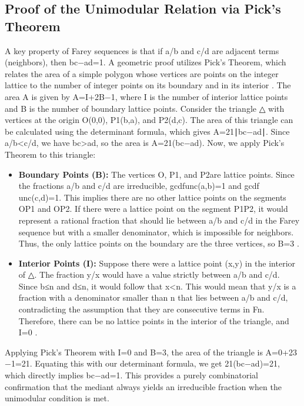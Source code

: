 \documentclass[12pt,a4paper]{article}
\theoremstyle{definition}
\theoremstyle{remark}
\begin{document}
\subsection{Proof of the Unimodular Relation via Pick's Theorem}
A key property of Farey sequences is that if a/b and c/d are adjacent terms (neighbors), then bc−ad=1. A geometric proof utilizes Pick's Theorem, which relates the area of a simple polygon whose vertices are points on the integer lattice to the number of integer points on its boundary and in its interior \cite{DUMMIT}. The area A is given by A=I+2B​−1, where I is the number of interior lattice points and B is the number of boundary lattice points.
Consider the triangle △ with vertices at the origin O(0,0), P1​(b,a), and P2​(d,c). The area of this triangle can be calculated using the determinant formula, which gives A=21​∣bc−ad∣. Since a/b<c/d, we have bc>ad, so the area is A=21​(bc−ad).
Now, we apply Pick's Theorem to this triangle:
\begin{itemize}
\item \textbf{Boundary Points (B):} The vertices O, P1​, and P2​ are lattice points. Since the fractions a/b and c/d are irreducible, gcdf​unc(a,b)=1 and gcdf​unc(c,d)=1. This implies there are no other lattice points on the segments OP1​ and OP2​. If there were a lattice point on the segment P1​P2​, it would represent a rational fraction that should lie between a/b and c/d in the Farey sequence but with a smaller denominator, which is impossible for neighbors. Thus, the only lattice points on the boundary are the three vertices, so B=3 \cite{DUMMIT}.
\item \textbf{Interior Points (I):} Suppose there were a lattice point (x,y) in the interior of △. The fraction y/x would have a value strictly between a/b and c/d. Since b≤n and d≤n, it would follow that x<n. This would mean that y/x is a fraction with a denominator smaller than n that lies between a/b and c/d, contradicting the assumption that they are consecutive terms in Fn​. Therefore, there can be no lattice points in the interior of the triangle, and I=0 \cite{DUMMIT}.
\end{itemize}
Applying Pick's Theorem with I=0 and B=3, the area of the triangle is A=0+23​−1=21​. Equating this with our determinant formula, we get 21​(bc−ad)=21​, which directly implies bc−ad=1. This provides a purely combinatorial confirmation that the mediant always yields an irreducible fraction when the unimodular condition is met.
\end{document}
